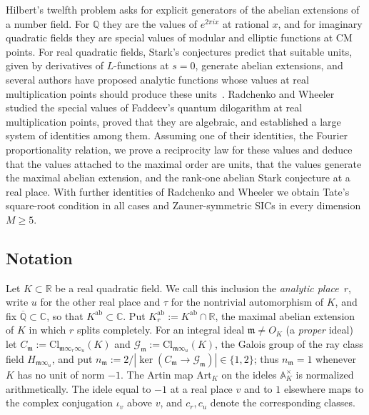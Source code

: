 \documentclass[11pt]{amsart}
\numberwithin{equation}{section}
\theoremstyle{plain}
\theoremstyle{definition}
\theoremstyle{remark}
\newcommand{\A}{\mathbb{A}}
\newcommand{\Kab}{K^{\mathrm{ab}}}
\newcommand{\Art}{\mathrm{Art}}
\begin{document}
Hilbert's twelfth problem asks for explicit generators of the abelian extensions of a number field. For $\mathbb Q$ they are the values of $e^{2\pi ix}$ at rational $x$, and for imaginary quadratic fields they are special values of modular and elliptic functions at CM points. For real quadratic fields, Stark's conjectures predict that suitable units, given by derivatives of $L$-functions at $s=0$, generate abelian extensions, and several authors have proposed analytic functions whose values at real multiplication points should produce these units~\cite{Ko, AFK}. Radchenko and Wheeler~\cite{RW} studied the special values of Faddeev's quantum dilogarithm at real multiplication points, proved that they are algebraic, and established a large system of identities among them. Assuming one of their identities, the Fourier proportionality relation, we prove a reciprocity law for these values and deduce that the values attached to the maximal order are units, that the values generate the maximal abelian extension, and the rank-one abelian Stark conjecture at a real place. With further identities of Radchenko and Wheeler we obtain Tate's square-root condition in all cases and Zauner-symmetric SICs in every dimension $M\ge5$.

\subsection*{Notation}
Let $K\subset\mathbb R$ be a real quadratic field. We call this inclusion the \emph{analytic place}~$r$, write $u$ for the other real place and $\tau$ for the nontrivial automorphism of $K$, and fix $\overline{\mathbb Q}\subset\mathbb C$, so that $\Kab\subset\mathbb C$. Put $\Kab_r:=\Kab\cap\mathbb R$, the maximal abelian extension of $K$ in which $r$ splits completely. For an integral ideal $\mathfrak m\neq O_K$ (a \emph{proper} ideal) let $C_{\mathfrak m}:=\mathrm{Cl}_{\mathfrak m\infty_r\infty_u}(K)$ and $\mathcal G_{\mathfrak m}:=\mathrm{Cl}_{\mathfrak m\infty_u}(K)$, the Galois group of the ray class field $H_{\mathfrak m\infty_u}$, and put $n_{\mathfrak m}:=2/|\ker(C_{\mathfrak m}\to\mathcal G_{\mathfrak m})|\in\{1,2\}$; thus $n_{\mathfrak m}=1$ whenever $K$ has no unit of norm $-1$. The Artin map $\Art_K$ on the ideles $\A_K^\times$ is normalized arithmetically. The idele equal to $-1$ at a real place $v$ and to $1$ elsewhere maps to the complex conjugation $\iota_v$ above $v$, and $c_r,c_u$ denote the corresponding classes.
\end{document}
